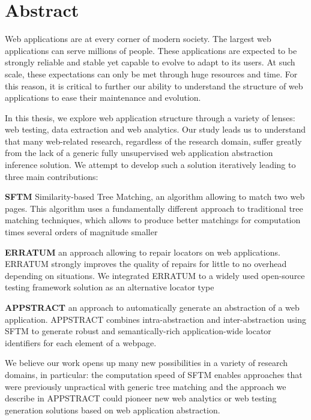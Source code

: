 \thispagestyle{empty}
\section*{Abstract}

\begin{doublespace}
Web applications are at every corner of modern society.
The largest web applications can serve millions of people.
These applications are expected to be strongly reliable and stable yet capable to evolve to adapt to its users.
At such scale, these expectations can only be met through huge resources and time. 
For this reason, it is critical to further our ability to understand the structure of web applications to ease their maintenance and evolution.

In this thesis, we explore web application structure through a variety of lenses: web testing, data extraction and web analytics.
Our study leads us to understand that many web-related research, regardless of the research domain, suffer greatly from the lack of a generic fully unsupervised web application abstraction inference solution. We attempt to develop such a solution iteratively leading to three main contributions:

    \textbf{SFTM} Similarity-based Tree Matching, an algorithm allowing to match two web pages. This algorithm uses a fundamentally different approach to traditional tree matching techniques, which allows to produce better matchings for computation times several orders of magnitude smaller
    
    \textbf{ERRATUM} an approach allowing to repair locators on web applications. ERRATUM strongly improves the quality of repairs for little to no overhead depending on situations. We integrated ERRATUM to a widely used open-source testing framework solution as an alternative locator type
    
    \textbf{APPSTRACT} an approach to automatically generate an abstraction of a web application. APPSTRACT combines intra-abstraction and inter-abstraction using SFTM to generate robust and semantically-rich application-wide locator identifiers for each element of a webpage.

We believe our work opens up many new possibilities in a variety of research domains, in particular: the computation speed of SFTM enables approaches that were previously unpractical with generic tree matching and the approach we describe in APPSTRACT could pioneer new web analytics or web testing generation solutions based on web application abstraction.
\end{doublespace}

